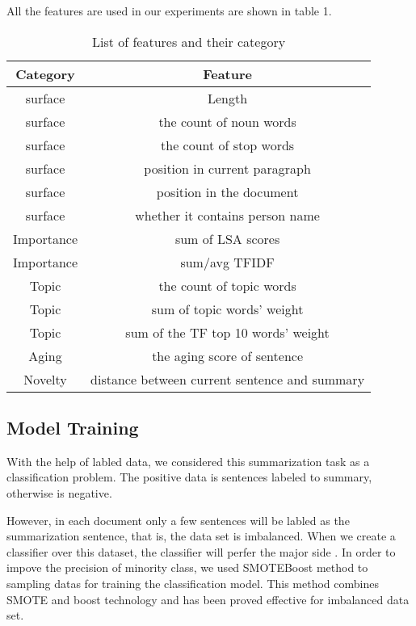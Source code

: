 \documentclass{acm_proc_article-sp}
\begin{document}
All the features are used in our experiments are shown in table 1.

\begin{table}
\centering
\caption{List of features and their category}
\begin{tabular}{c|c}
\hline
Category & Feature\\
\hline
surface & Length\\
surface & the count of noun words\\
surface & the count of stop words\\
surface & position in current paragraph\\
surface & position in the document\\
surface & whether it contains person name\\
\hline
Importance & sum of LSA scores\\
Importance & sum/avg TFIDF\\
\hline
Topic & the count of topic words\\
Topic & sum of topic words' weight\\
Topic & sum of the TF top 10 words' weight  \\
\hline
Aging & the aging score of sentence\\
\hline 
Novelty & distance between current sentence and summary\\
\hline
 
\end{tabular}
\end{table}


\subsection{Model Training}

With the help of labled data, we considered this summarization task as a classification problem. The positive data is sentences labeled to summary, otherwise is negative. 

However, in each document only a few sentences will be labled as the summarization sentence, that is, the data set is imbalanced. 
When we create a classifier over this dataset, the classifier will perfer the major side \cite{chawla2003smoteboost}.
In order to impove the precision of minority class, we used SMOTEBoost\cite{chawla2003smoteboost} method to sampling datas for training the classification model. 
This method combines SMOTE \cite{chawla2011smote} and boost technology and has been proved effective for imbalanced data set. 
\end{document}

